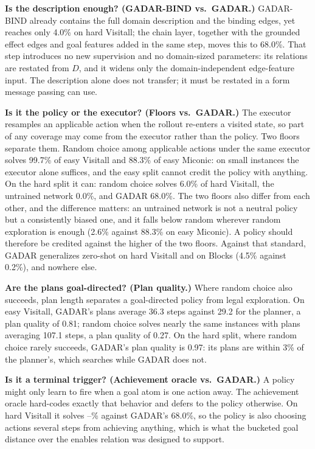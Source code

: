 \documentclass{article} %
\newcommand{\gadar}{GADAR}                 %
\newcommand{\gadarbind}{\gadar{}-BIND}     %
\newcommand{\todonum}[1]{#1}
\begin{document}
\textbf{Is the description enough? (\gadarbind{} vs.\ \gadar{}.)}
\gadarbind{} already contains the full domain description and the binding
edges, yet reaches only \todonum{4.0}\% on hard Visitall; the chain layer,
together with the grounded effect edges and goal features added in the same
step, moves this to \todonum{68.0}\%. That step introduces no new supervision
and no domain-sized parameters: its relations are restated from $D$, and it
widens only the domain-independent edge-feature input. The description alone does not transfer; it must be restated in
a form message passing can use.

\textbf{Is it the policy or the executor? (Floors vs.\ \gadar{}.)} The
executor resamples an applicable action when the rollout re-enters a
visited state, so part of any coverage may come from the executor rather
than the policy. Two floors separate them. Random choice among applicable
actions under the same executor solves 99.7\% of easy Visitall and 88.3\%
of easy Miconic: on small instances the executor alone suffices, and the
easy split cannot credit the policy with anything. On the hard split it
can: random choice solves 6.0\% of hard Visitall, the untrained network
\todonum{0.0}\%, and \gadar{} \todonum{68.0}\%. The two floors also differ
from each other, and the difference matters: an untrained network is not a
neutral policy but a consistently biased one, and it falls below random
wherever random exploration is enough (\todonum{2.6}\% against 88.3\% on
easy Miconic). A policy should therefore be credited against the higher of
the two floors. Against that standard, \gadar{} generalizes zero-shot on hard Visitall
and on Blocks (\todonum{4.5}\% against 0.2\%), and nowhere else.

\textbf{Are the plans goal-directed? (Plan quality.)} Where random choice
also succeeds, plan length separates a goal-directed policy from legal
exploration. On easy Visitall, \gadar{}'s plans average \todonum{36.3}
steps against 29.2 for the planner, a plan quality of \todonum{0.81}; random
choice solves nearly the same instances with plans averaging 107.1 steps, a
plan quality of 0.27. On the hard split, where random choice rarely
succeeds, \gadar{}'s plan quality is \todonum{0.97}: its plans are within
\todonum{3}\% of the planner's, which searches while \gadar{} does not.

\textbf{Is it a terminal trigger? (Achievement oracle vs.\ \gadar{}.)} A
policy might only learn to fire when a goal atom is one action away. The
achievement oracle hard-codes exactly that behavior and defers to the
policy otherwise. On hard Visitall it solves \todonum{--}\% against
\gadar{}'s \todonum{68.0}\%, so the policy is also choosing actions several
steps from achieving anything, which is what the bucketed goal distance
over the enables relation was designed to support.
\end{document}
